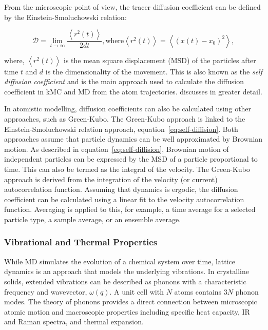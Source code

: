 \documentclass[../main.tex]{subfiles}
\begin{document}
From the microscopic point of view, the tracer diffusion coefficient can be defined by the Einstein-Smoluchowski relation: \cite{einstein1905presumed,von1906kinetischen}

\begin{equation}
    \mathcal{D} = \lim_{t\to\infty} \frac{\left <r^2(t)\right >}{2dt}, \mathrm{where} \left <r^2(t)\right > = \left< \left(x(t) - x_0 \right)^2 \right>,
    \label{eq:self-diffision}
\end{equation}

where, $\left <r^2(t)\right >$ is the mean square displacement (MSD) of the particles after time $t$ and $d$ is the dimensionality of the movement. This is also known as the \textit{self diffusion coefficient} and is the main approach used to calculate the diffusion coefficient in kMC and MD from the atom trajectories. \citeauthor{VanderVen2020} discusses in greater detail.\cite{VanderVen2020}

In atomistic modelling, diffusion coefficients can also be calculated using other approaches, such as Green-Kubo. The Green-Kubo approach is linked to the Einstein-Smoluchowski relation approach, equation~\ref{eq:self-diffision}. Both approaches assume that particle dynamics can be well approximated by Brownian motion. As described in equation~\ref{eq:self-diffision}, Brownian motion of independent particles can be expressed by the MSD of a particle proportional to time. This can also be termed as the integral of the velocity. The Green-Kubo approach is derived from the integration of the velocity (or current) autocorrelation function. Assuming that dynamics is ergodic, the diffusion coefficient can be calculated using a linear fit to the velocity autocorrelation function. Averaging is applied to this, for example, a time  average for a selected particle type, a sample average, or an ensemble average.


\subsubsection{Vibrational and Thermal Properties}
\label{sec:thermal_electronic_vibrational}
While MD simulates the evolution of a chemical system over time, lattice dynamics is an approach that models the underlying vibrations. In crystalline solids, extended vibrations can be described as phonons with a characteristic frequency and wavevector, $\omega(q)$. A unit cell with $N$ atoms contains 3$N$ phonon modes. The theory of phonons provides a direct connection between microscopic atomic motion and macroscopic properties including specific heat capacity, IR and Raman spectra, and thermal expansion.\cite{ladd1986lattice, turney2009predicting,seko2015prediction} 
\end{document}
